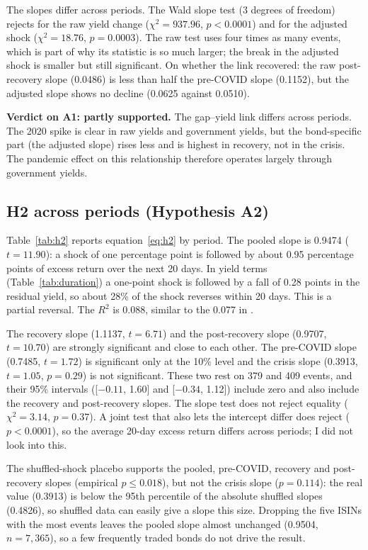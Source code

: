\documentclass[a4paper,11pt]{article}
\begin{document}
The slopes differ across periods. The Wald slope test (3 degrees of freedom) rejects for the raw yield change ($\chi^2 = 937.96$, $p < 0.0001$) and for the adjusted shock ($\chi^2 = 18.76$, $p = 0.0003$). The raw test uses four times as many events, which is part of why its statistic is so much larger; the break in the adjusted shock is smaller but still significant. On whether the link recovered: the raw post-recovery slope (0.0486) is less than half the pre-COVID slope (0.1152), but the adjusted slope shows no decline (0.0625 against 0.0510).

\textbf{Verdict on A1: partly supported.} The gap--yield link differs across periods. The 2020 spike is clear in raw yields and government yields, but the bond-specific part (the adjusted slope) rises less and is highest in recovery, not in the crisis. The pandemic effect on this relationship therefore operates largely through government yields.

\subsection{H2 across periods (Hypothesis A2)}
Table~\ref{tab:h2} reports equation~\eqref{eq:h2} by period. The pooled slope is 0.9474 ($t = 11.90$): a shock of one percentage point is followed by about 0.95 percentage points of excess return over the next 20 days. In yield terms (Table~\ref{tab:duration}) a one-point shock is followed by a fall of 0.28 points in the residual yield, so about 28\% of the shock reverses within 20 days. This is a partial reversal. The $R^2$ is 0.088, similar to the 0.077 in \cite{kumar2026delayed}.

The recovery slope (1.1137, $t = 6.71$) and the post-recovery slope (0.9707, $t = 10.70$) are strongly significant and close to each other. The pre-COVID slope (0.7485, $t = 1.72$) is significant only at the 10\% level and the crisis slope (0.3913, $t = 1.05$, $p = 0.29$) is not significant. These two rest on 379 and 409 events, and their 95\% intervals ([$-0.11$, 1.60] and [$-0.34$, 1.12]) include zero and also include the recovery and post-recovery slopes. The slope test does not reject equality ($\chi^2 = 3.14$, $p = 0.37$). A joint test that also lets the intercept differ does reject ($p < 0.0001$), so the average 20-day excess return differs across periods; I did not look into this.

The shuffled-shock placebo supports the pooled, pre-COVID, recovery and post-recovery slopes (empirical $p \le 0.018$), but not the crisis slope ($p = 0.114$): the real value (0.3913) is below the 95th percentile of the absolute shuffled slopes (0.4826), so shuffled data can easily give a slope this size. Dropping the five ISINs with the most events leaves the pooled slope almost unchanged (0.9504, $n = 7{,}365$), so a few frequently traded bonds do not drive the result.
\end{document}
